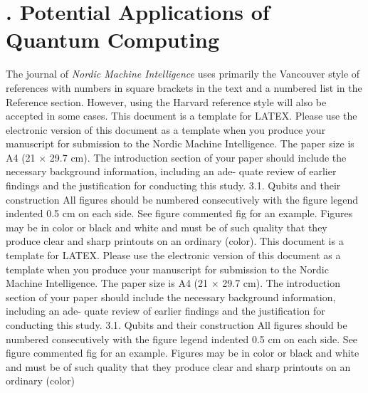 \documentclass{elbioimp2}
\begin{document}
\section{. Potential Applications of Quantum Computing}
The journal of \emph{Nordic Machine Intelligence} uses primarily the Vancouver
style of references with numbers in square brackets in the text and a
numbered list in the Reference section.\cite{biomed-req} However, using the
Harvard reference style will also be accepted in some cases.
This document is a template for LATEX. Please use
the electronic version of this document as a template
when you produce your manuscript for submission to the
Nordic Machine Intelligence. The paper size is A4 (21 ×
29.7 cm).
The introduction section of your paper should include
the necessary background information, including an ade-
quate review of earlier findings and the justification for
conducting this study.
3.1. Qubits and their construction
All figures should be numbered consecutively with the
figure legend indented 0.5 cm on each side. See figure
commented fig for an example. Figures may be in color
or black and white and must be of such quality that they
produce clear and sharp printouts on an ordinary (color).
This document is a template for LATEX. Please use
the electronic version of this document as a template
when you produce your manuscript for submission to the
Nordic Machine Intelligence. The paper size is A4 (21 ×
29.7 cm).
The introduction section of your paper should include
the necessary background information, including an ade-
quate review of earlier findings and the justification for
conducting this study.
3.1. Qubits and their construction
All figures should be numbered consecutively with the
figure legend indented 0.5 cm on each side. See figure
commented fig for an example. Figures may be in color
or black and white and must be of such quality that they
produce clear and sharp printouts on an ordinary (color)
\end{document}
